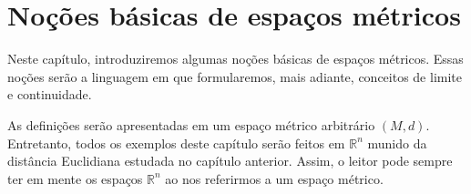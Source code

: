 \chapter{Noções básicas de espaços métricos}
Neste capítulo, introduziremos algumas noções básicas de espaços métricos.
Essas noções serão a linguagem em que formularemos, mais adiante, conceitos de limite e continuidade.

As definições serão apresentadas em um espaço métrico arbitrário $(M,d)$.
Entretanto, todos os exemplos deste capítulo serão feitos em $\mathbb R^n$ munido da distância Euclidiana estudada no capítulo anterior.
Assim, o leitor pode sempre ter em mente os espaços $\mathbb R^n$ ao nos referirmos a um espaço métrico.






